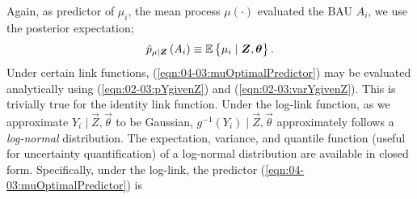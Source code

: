 \documentclass[12pt,a4paper]{article}
\begin{document}
\begin{appendices}
Again, as predictor of $\mu_i$, the mean process $\mu(\cdot)$ evaluated the BAU $A_i$, we use the posterior expectation;
\begin{equation}\label{eqn:04-03:muOptimalPredictor}
    \pmugivenZ{A_i} 
    \equiv 
    \ECurly{\mu_i \mid \vec{Z}, \vec{\theta}}.
\end{equation}
Under certain link functions, (\ref{eqn:04-03:muOptimalPredictor}) may be evaluated analytically using (\ref{eqn:02-03:pYgivenZ}) and (\ref{eqn:02-03:varYgivenZ}). 
 This is trivially true for the identity link function.
Under the log-link function, as we approximate $Y_i \mid \vec{Z}, \vec{\theta}$ to be Gaussian, $g^{-1}\!\left(Y_i\right) \mid \vec{Z}, \vec{\theta}$ approximately follows a \textit{log-normal} distribution.
The expectation, variance, and quantile function (useful for uncertainty quantification) of a log-normal distribution are available in closed form. 
Specifically, under the log-link, the predictor (\ref{eqn:04-03:muOptimalPredictor}) is

\end{appendices}
\end{document}
